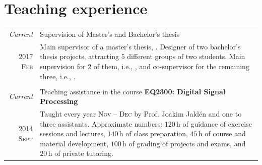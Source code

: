 \documentclass[a4paper,10pt]{article}
\begin{document}
  \section{Teaching experience}
  
    \begin{bibunit}
    \begin{tabular}{r|p{13cm}}
      
      \emph{Current}	 & Supervision of Master's and Bachelor's thesis \\
      \textsc{2017 Feb}  & \footnotesize{Main supervisor of a master's thesis, \cite{Jones2018}. 
							Designer of two bachelor's thesis projects, attracting $5$ 
							different groups of two students. Main supervision for $2$ of them,
							i.e., \cite{F2A2018,F2B2018}, and co-supervisor for the remaining three,
							i.e., \cite{F3A2018,F3B2018,F3C2018}. } \\      
      \multicolumn{2}{c}{} \\
      
	  \emph{Current}     & Teaching assistance in the course \textbf{EQ2300: Digital Signal Processing} \\
	  \textsc{2014 Sept} & \footnotesize{Taught every year \textsc{Nov -- Dec} by Prof. Joakim Jald\'{e}n and 
							one to three assistants. Approximate numbers: $120\,\mathrm{h}$ of guidance of 
							exercise sessions and lectures, $140\,\mathrm{h}$ of 
							class preparation, $45\,\mathrm{h}$ of course and material development,
							$100\,\mathrm{h}$ of grading of projects and exams, and $20\,\mathrm{h}$ of private tutoring.} \\
     
    \end{tabular}

	
      \renewcommand\refname{\normalsize{Supervised theses}}
	  \footnotesize{
      }
	\end{bibunit}
  

  \vspace{-10pt}
  
\end{document}
